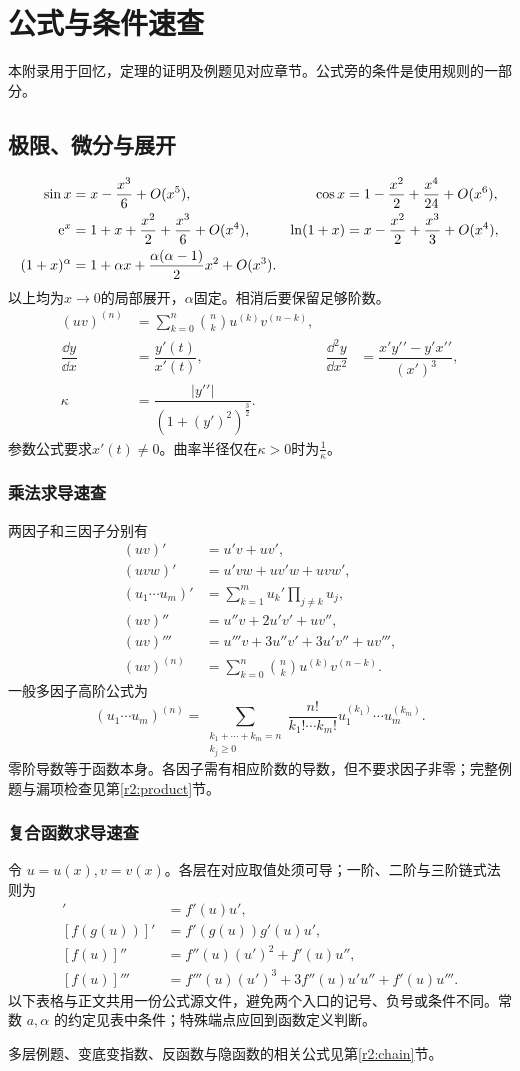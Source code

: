 \chapter{公式与条件速查}\label{app:formulas}
本附录用于回忆，定理的证明及例题见对应章节。公式旁的条件是使用规则的一部分。
\section{极限、微分与展开}
\begin{align}
\sin x&=x-\dfrac{x^3}{6}+O(x^5),&\cos x&=1-\dfrac{x^2}{2}+\dfrac{x^4}{24}+O(x^6),\\
\mathrm{e}^x&=1+x+\dfrac{x^2}{2}+\dfrac{x^3}{6}+O(x^4),&\ln(1+x)&=x-\dfrac{x^2}{2}+\dfrac{x^3}{3}+O(x^4),\\
(1+x)^\alpha&=1+\alpha x+\dfrac{\alpha(\alpha-1)}2x^2+O(x^3).
\end{align}
以上均为$x\to0$的局部展开，$\alpha$固定。相消后要保留足够阶数。
\begin{align}
(uv)^{(n)}&=\sum_{k=0}^n\binom nk u^{(k)}v^{(n-k)},\\
\dfrac{\dd y}{\dd x}&=\dfrac{y\prime(t)}{x\prime(t)},&
\dfrac{\dd^2y}{\dd x^2}&=\dfrac{x\prime y\prime\prime-y\prime x\prime\prime}{(x\prime)^3},\\
\kappa&=\dfrac{|y\prime\prime|}{(1+(y\prime)^2)^{\frac{3}{2}}}.
\end{align}
参数公式要求$x\prime(t)\ne0$。曲率半径仅在$\kappa>0$时为$\frac{1}{\kappa}$。
\subsection{乘法求导速查}
两因子和三因子分别有
\begin{align*}
(uv)'&=u'v+uv',\\
(uvw)'&=u'vw+uv'w+uvw',\\
(u_1\cdots u_m)'&=\sum_{k=1}^m u_k'\prod_{j\ne k}u_j,\\
(uv)''&=u''v+2u'v'+uv'',\\
(uv)'''&=u'''v+3u''v'+3u'v''+uv''',\\
(uv)^{(n)}&=\sum_{k=0}^n\binom nk u^{(k)}v^{(n-k)}.
\end{align*}
一般多因子高阶公式为
\[
 (u_1\cdots u_m)^{(n)}=
 \sum_{\substack{k_1+\cdots+k_m=n\\k_j\ge0}}
 \frac{n!}{k_1!\cdots k_m!}u_1^{(k_1)}\cdots u_m^{(k_m)}.
\]
零阶导数等于函数本身。各因子需有相应阶数的导数，但不要求因子非零；完整例题与漏项检查见第\ref{r2:product}节。
\subsection{复合函数求导速查}
令 $u=u(x),v=v(x)$。各层在对应取值处须可导；一阶、二阶与三阶链式法则为
\begin{align*}
 [f(u)]'&=f'(u)u',\\
 [f(g(u))]'&=f'(g(u))g'(u)u',\\
 [f(u)]''&=f''(u)(u')^2+f'(u)u'',\\
 [f(u)]'''&=f'''(u)(u')^3+3f''(u)u'u''+f'(u)u'''.
\end{align*}
以下表格与正文共用一份公式源文件，避免两个入口的记号、负号或条件不同。常数 $a,\alpha$ 的约定见表中条件；特殊端点应回到函数定义判断。

多层例题、变底变指数、反函数与隐函数的相关公式见第\ref{r2:chain}节。
